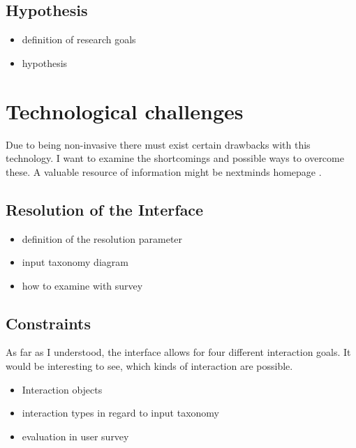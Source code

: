         \section{Hypothesis}

            \begin{itemize}
                \item definition of research goals
                \item hypothesis
            \end{itemize}

    \chapter{Technological challenges}

        Due to being non-invasive there must exist certain drawbacks with this technology. I want to examine the shortcomings and possible ways to overcome these.    
        A valuable resource of information might be nextminds homepage \cite{NextMind}.

        \section{Resolution of the Interface}

            \begin{itemize}
                \item definition of the resolution parameter
                \item input taxonomy diagram
                \item how to examine with survey                                     
            \end{itemize}

        \section{Constraints}

            As far as I understood, the interface allows for four different interaction goals. It would be interesting to see, which kinds of interaction are possible.                

            \begin{itemize}
                \item Interaction objects
                \item interaction types in regard to input taxonomy
                \item evaluation in user survey
            \end{itemize}

